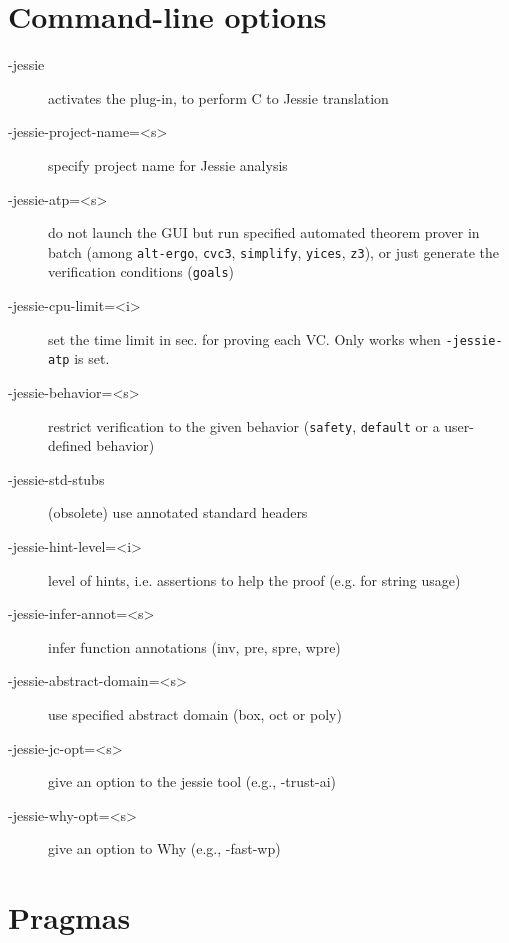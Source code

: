 \documentclass[a4paper,11pt,twoside,openright]{report}
\begin{document}
\section{Command-line options}

\begin{description}
\item[-jessie]
  activates the plug-in, to perform C to Jessie translation

\item[-jessie-project-name=<s>]
  specify project name for Jessie analysis

\item[-jessie-atp=<s>] do not launch the GUI but run specified
  automated theorem prover in batch (among \verb|alt-ergo|,
  \verb|cvc3|, \verb|simplify|, \verb|yices|, \verb|z3|), or just
  generate the verification conditions (\verb|goals|)

\item[-jessie-cpu-limit=<i>] set the time limit in sec. for proving
  each VC. Only works when \verb|-jessie-atp| is set.

\item[-jessie-behavior=<s>] restrict verification to the given
  behavior (\texttt{safety}, \texttt{default} or a user-defined
  behavior)

\item[-jessie-std-stubs]
  (obsolete) use annotated standard headers

\item[-jessie-hint-level=<i>]
  level of hints, i.e. assertions to help the
  proof (e.g. for string usage)

\item[-jessie-infer-annot=<s>]
  infer function annotations (inv, pre, spre, wpre)

\item[-jessie-abstract-domain=<s>]
  use specified abstract domain (box, oct or poly)

\item[-jessie-jc-opt=<s>] give an option to
  the jessie tool (e.g., -trust-ai)

\item[-jessie-why-opt=<s>]
  give an option to Why (e.g., -fast-wp)
\end{description}

\section{Pragmas}
\end{document}
